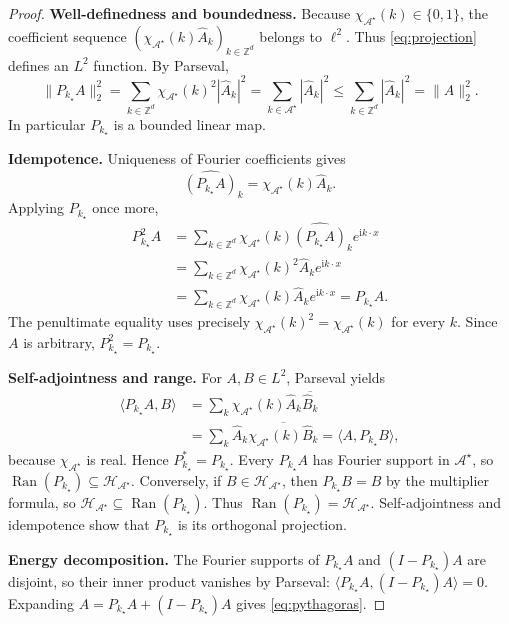 \documentclass[11pt]{article}
\newcommand{\ZZ}{\mathbb{Z}}
\newcommand{\calA}{\mathcal{A}^{\star}}
\newcommand{\calH}{\mathcal{H}_{\calA}}
\newcommand{\PA}{P_{k_{\star}}}
\newcommand{\ii}{\mathrm{i}}
\begin{document}
\begin{proof}
\textbf{Well-definedness and boundedness.}
Because $\chi_{\calA}(k)\in\{0,1\}$, the coefficient sequence
$(\chi_{\calA}(k)\widehat A_k)_{k\in\ZZ^d}$ belongs to $\ell^{2}$.
Thus \eqref{eq:projection} defines an $L^{2}$ function.  By Parseval,
\begin{equation}\label{eq:contraction}
\|\PA A\|_{2}^{2}
 =\sum_{k\in\ZZ^{d}}\chi_{\calA}(k)^{2}|\widehat A_{k}|^{2}
 =\sum_{k\in\calA}|\widehat A_{k}|^{2}
 \leq\sum_{k\in\ZZ^{d}}|\widehat A_{k}|^{2}
 =\|A\|_{2}^{2}.
\end{equation}
In particular $\PA$ is a bounded linear map.

\medskip\noindent
\textbf{Idempotence.}
Uniqueness of Fourier coefficients gives
\begin{equation}
\widehat{(\PA A)}_k=\chi_{\calA}(k)\widehat A_k.
\end{equation}
Applying $\PA$ once more,
\begin{align}
\PA^{2}A
 &=\sum_{k\in\ZZ^{d}}\chi_{\calA}(k)
       \widehat{(\PA A)}_k e^{\ii k\cdot x}\\
 &=\sum_{k\in\ZZ^{d}}\chi_{\calA}(k)^{2}
       \widehat A_k e^{\ii k\cdot x}\\
 &=\sum_{k\in\ZZ^{d}}\chi_{\calA}(k)
       \widehat A_k e^{\ii k\cdot x}
 =\PA A.
\end{align}
The penultimate equality uses precisely
$\chi_{\calA}(k)^{2}=\chi_{\calA}(k)$ for every $k$.
Since $A$ is arbitrary, $\boxed{\PA^{2}=\PA}$.

\medskip\noindent
\textbf{Self-adjointness and range.}
For $A,B\in L^{2}$, Parseval yields
\begin{align}
\langle\PA A,B\rangle
 &=\sum_k\chi_{\calA}(k)\widehat A_k\overline{\widehat B_k}\\
 &=\sum_k\widehat A_k\overline{\chi_{\calA}(k)\widehat B_k}
 =\langle A,\PA B\rangle,
\end{align}
because $\chi_{\calA}$ is real.  Hence $\PA^{*}=\PA$.
Every $\PA A$ has Fourier support in $\calA$, so
$\operatorname{Ran}(\PA)\subseteq\calH$.
Conversely, if $B\in\calH$, then $\PA B=B$ by the multiplier
formula, so $\calH\subseteq\operatorname{Ran}(\PA)$.
Thus $\operatorname{Ran}(\PA)=\calH$.  Self-adjointness and
idempotence show that $\PA$ is its orthogonal projection.

\medskip\noindent
\textbf{Energy decomposition.}
The Fourier supports of $\PA A$ and $(I-\PA)A$ are disjoint,
so their inner product vanishes by Parseval:
$\langle\PA A,(I-\PA)A\rangle=0$.
Expanding $A=\PA A+(I-\PA)A$ gives \eqref{eq:pythagoras}.


\end{proof}
\end{document}
